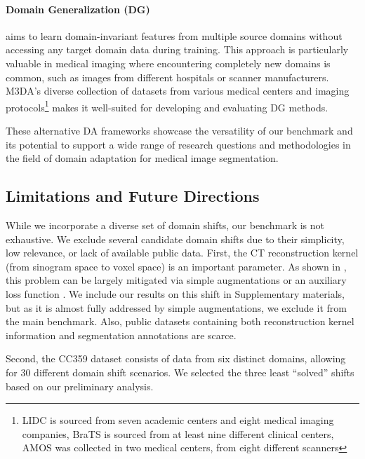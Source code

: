 \paragraph{Domain Generalization (DG)} aims to learn domain-invariant features from multiple source domains without accessing any target domain data during training. This approach is particularly valuable in medical imaging where encountering completely new domains is common, such as images from different hospitals or scanner manufacturers. M3DA's diverse collection of datasets from various medical centers and imaging protocols\footnote{LIDC is sourced from seven academic centers and eight medical imaging companies, BraTS is sourced from at least nine different clinical centers, AMOS was collected in two medical centers, from eight different scanners} makes it well-suited for developing and evaluating DG methods.

These alternative DA frameworks showcase the versatility of our benchmark and its potential to support a wide range of research questions and methodologies in the field of domain adaptation for medical image segmentation.


\subsection{Limitations and Future Directions}
\label{sec:da_bench:exp:limitations}

While we incorporate a diverse set of domain shifts, our benchmark is not exhaustive. We exclude several candidate domain shifts due to their simplicity, low relevance, or lack of available public data. First, the CT reconstruction kernel (from sinogram space to voxel space) is an important parameter. As shown in \cite{fbpaug}, this problem can be largely mitigated via simple augmentations or an auxiliary loss function \cite{shimovolos2022adaptation}. We include our results on this shift in Supplementary materials, but as it is almost fully addressed by simple augmentations, we exclude it from the main benchmark. Also, public datasets containing both reconstruction kernel information and segmentation annotations are scarce.

Second, the CC359 dataset consists of data from six distinct domains, allowing for 30 different domain shift scenarios. We selected the three least ``solved'' shifts based on our preliminary analysis.%


